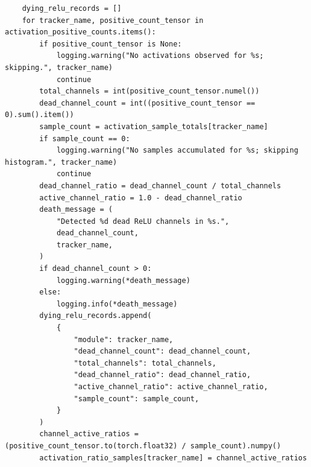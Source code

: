 \documentclass[11pt, oneside]{article}   	%
\begin{document}
\begin{answerbox}
\begin{verbatim}
    dying_relu_records = []
    for tracker_name, positive_count_tensor in activation_positive_counts.items():
        if positive_count_tensor is None:
            logging.warning("No activations observed for %s; skipping.", tracker_name)
            continue
        total_channels = int(positive_count_tensor.numel())
        dead_channel_count = int((positive_count_tensor == 0).sum().item())
        sample_count = activation_sample_totals[tracker_name]
        if sample_count == 0:
            logging.warning("No samples accumulated for %s; skipping histogram.", tracker_name)
            continue
        dead_channel_ratio = dead_channel_count / total_channels
        active_channel_ratio = 1.0 - dead_channel_ratio
        death_message = (
            "Detected %d dead ReLU channels in %s.",
            dead_channel_count,
            tracker_name,
        )
        if dead_channel_count > 0:
            logging.warning(*death_message)
        else:
            logging.info(*death_message)
        dying_relu_records.append(
            {
                "module": tracker_name,
                "dead_channel_count": dead_channel_count,
                "total_channels": total_channels,
                "dead_channel_ratio": dead_channel_ratio,
                "active_channel_ratio": active_channel_ratio,
                "sample_count": sample_count,
            }
        )
        channel_active_ratios = (positive_count_tensor.to(torch.float32) / sample_count).numpy()
        activation_ratio_samples[tracker_name] = channel_active_ratios
    

\end{verbatim}
\end{answerbox}
\end{document}
